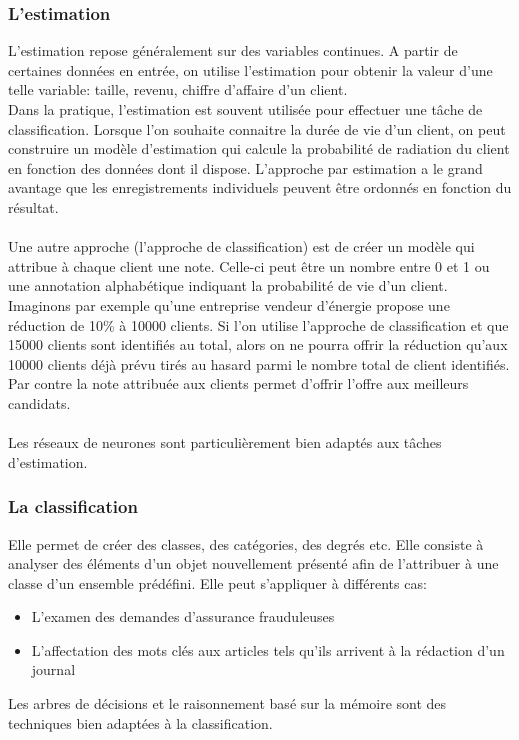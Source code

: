 \documentclass[11pt,a4paper]{report}
\begin{document}
\subsubsection{L'estimation}
L’estimation repose généralement sur des variables continues. A partir de certaines données en entrée, on utilise l’estimation pour obtenir la valeur d’une telle variable: taille, revenu, chiffre d’affaire d’un client.  \\
Dans la pratique, l’estimation est souvent utilisée pour effectuer une tâche de classification. Lorsque l’on souhaite connaitre la durée de vie d’un client, on peut construire un modèle d’estimation qui calcule la probabilité de radiation du client en fonction des données dont il dispose. L’approche par estimation a le grand avantage que les enregistrements individuels peuvent être ordonnés en fonction du résultat. \\ \\
Une autre approche (l’approche de classification) est de créer un modèle qui attribue à chaque client une note. Celle-ci peut être un nombre entre 0 et 1 ou une annotation alphabétique indiquant la probabilité de vie d’un client. Imaginons par exemple qu’une entreprise vendeur d’énergie propose une réduction de 10\% à 10000 clients. Si l’on utilise l’approche de classification et que 15000 clients sont identifiés au total, alors on ne pourra offrir la réduction qu’aux 10000 clients déjà prévu tirés au hasard parmi le nombre total de client identifiés. Par contre la note attribuée aux clients permet d’offrir l’offre aux meilleurs candidats. \\ \\
Les réseaux de neurones sont particulièrement bien adaptés aux tâches d’estimation. 
\subsubsection{La classification}
Elle permet de créer des classes, des catégories, des degrés etc. Elle consiste à analyser des éléments d’un objet nouvellement présenté afin de l’attribuer à une classe d’un ensemble prédéfini.
Elle peut s’appliquer à différents cas: \\
\begin{itemize}
\item L'examen des demandes d’assurance frauduleuses
\item L’affectation des mots clés aux articles tels qu’ils arrivent à la rédaction d’un journal
\end{itemize}
Les arbres de décisions et le raisonnement basé sur la mémoire sont des techniques bien adaptées à la classification.
\end{document}

